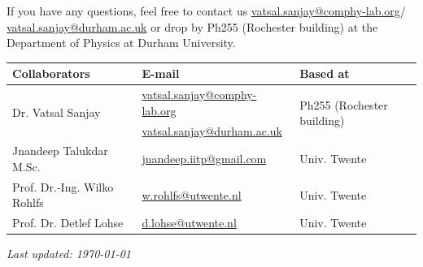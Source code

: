 \documentclass[11pt]{article}
\begin{document}
If you have any questions, feel free to contact us \href{mailto:vatsal.sanjay@comphy-lab.org}{vatsal.sanjay@comphy-lab.org}/\\\href{mailto:vatsal.sanjay@durham.ac.uk}{vatsal.sanjay@durham.ac.uk} or drop by Ph255 (Rochester building) at the Department of Physics at Durham University.

\begin{center}
\begin{tabular}{|l|l|l|}
\hline \textbf{Collaborators} & \textbf{E-mail} & \textbf{Based at} \\
\hline \multirow{2}{*}{Dr. Vatsal Sanjay} & \href{mailto:vatsal.sanjay@comphy-lab.org}{vatsal.sanjay@comphy-lab.org} & \multirow{2}{*}{Ph255 (Rochester building)} \\
& \href{mailto:vatsal.sanjay@durham.ac.uk}{vatsal.sanjay@durham.ac.uk} & \\
\hline Jnandeep Talukdar M.Sc. & \href{mailto:jnandeep.iitp@gmail.com}{jnandeep.iitp@gmail.com} & Univ. Twente \\
\hline Prof. Dr.-Ing. Wilko Rohlfs   & \href{mailto:w.rohlfs@utwente.nl }{w.rohlfs@utwente.nl }& Univ. Twente \\
\hline Prof. Dr. Detlef Lohse & \href{mailto:d.lohse@utwente.nl}{d.lohse@utwente.nl} & Univ. Twente  \\
\hline
\end{tabular}
\end{center}

\vspace{1em}
\noindent\textit{Last updated: \today}

\printbibliography
\end{document}
